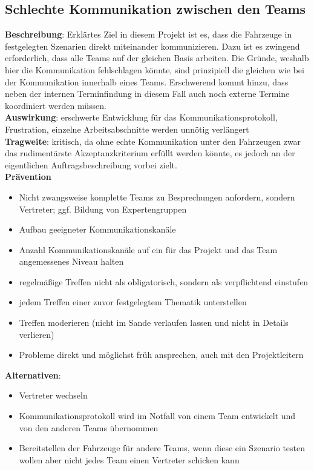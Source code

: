 \documentclass[a4paper, 12pt, titlepage]{scrartcl}
\begin{document}
	\subsection{Schlechte Kommunikation zwischen den Teams}
		\textbf{Beschreibung}: Erkl\"artes Ziel in diesem Projekt ist es, dass die Fahrzeuge in festgelegten Szenarien direkt miteinander kommunizieren. Dazu ist es zwingend erforderlich, dass alle Teams auf der gleichen Basis arbeiten. Die Gr\"unde, weshalb hier die Kommunikation fehlschlagen k\"onnte, sind prinzipiell die gleichen wie bei der Kommunikation innerhalb eines Teams. Erschwerend kommt hinzu, dass neben der internen Terminfindung in diesem Fall auch noch externe Termine koordiniert werden m\"ussen.\\
		\textbf{Auswirkung}: erschwerte Entwicklung f\"ur das Kommunikationsprotokoll, Frustration, einzelne Arbeitsabschnitte werden unn\"otig verl\"angert\\
		\textbf{Tragweite}: kritisch, da ohne echte Kommunikation unter den Fahrzeugen zwar das rudiment\"arste Akzeptanzkriterium erf\"ullt werden k\"onnte, es jedoch an der eigentlichen Auftragsbeschreibung vorbei zielt.\\
		\textbf{Pr\"avention}
			\begin{itemize}
				\item Nicht zwangsweise komplette Teams zu Besprechungen anfordern, sondern Vertreter; ggf. Bildung von Expertengruppen
				\item Aufbau geeigneter Kommunikationskan\"ale
				\item Anzahl Kommunikationskan\"ale auf ein f\"ur das Projekt und das Team angemessenes Niveau halten
				\item regelm\"a\ss ige Treffen nicht als obligatorisch, sondern als verpflichtend einstufen
				\item jedem Treffen einer zuvor festgelegtem Thematik unterstellen
				\item Treffen moderieren (nicht im Sande verlaufen lassen und nicht in Details verlieren)
				\item Probleme direkt und m\"oglichst fr\"uh ansprechen, auch mit den Projektleitern
			\end{itemize}
		\textbf{Alternativen}: 
			\begin{itemize}
				\item Vertreter wechseln
				\item Kommunikationsprotokoll wird im Notfall von einem Team entwickelt und von den anderen Teams \"ubernommen
				\item Bereitstellen der Fahrzeuge f\"ur andere Teams, wenn diese ein Szenario testen wollen aber nicht jedes Team einen Vertreter schicken kann
			\end{itemize}
		
\end{document}
